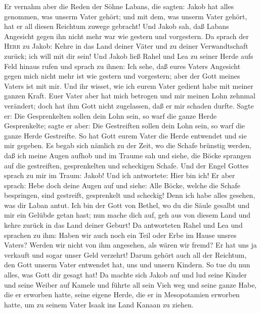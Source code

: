  Er vernahm aber die Reden der Söhne Labans, die sagten:
Jakob hat alles genommen, was unserm Vater gehört; und mit dem, was
unserm Vater gehört, hat er all diesen Reichtum zuwege gebracht!
 Und Jakob sah, daß Labans Angesicht gegen ihn nicht mehr
war wie gestern und vorgestern.  Da sprach der
\textsc{Herr} zu Jakob: Kehre in das Land deiner Väter und zu deiner
Verwandtschaft zurück; ich will mit dir sein!  Und Jakob
ließ Rahel und Lea zu seiner Herde aufs Feld hinaus rufen 
und sprach zu ihnen: Ich sehe, daß eures Vaters Angesicht gegen mich
nicht mehr ist wie gestern und vorgestern; aber der Gott meines Vaters
ist mit mir.  Und ihr wisset, wie ich eurem Vater gedient
habe mit meiner ganzen Kraft.  Euer Vater aber hat mich
betrogen und mir meinen Lohn zehnmal verändert; doch hat ihm Gott nicht
zugelassen, daß er mir schaden durfte.  Sagte er: Die
Gesprenkelten sollen dein Lohn sein, so warf die ganze Herde
Gesprenkelte; sagte er aber: Die Gestreiften sollen dein Lohn sein, so
warf die ganze Herde Gestreifte.  So hat Gott eurem Vater
die Herde entwendet und sie mir gegeben.  Es begab sich
nämlich zu der Zeit, wo die Schafe brünstig werden, daß ich meine Augen
aufhob und im Traume sah und siehe, die Böcke sprangen auf die
gestreiften, gesprenkelten und scheckigen Schafe.  Und
der Engel Gottes sprach zu mir im Traum: Jakob! Und ich antwortete: Hier
bin ich!  Er aber sprach: Hebe doch deine Augen auf und
siehe: Alle Böcke, welche die Schafe bespringen, sind gestreift,
gesprenkelt und scheckig! Denn ich habe alles gesehen, was dir Laban
antut.  Ich bin der Gott von Bethel, wo du die Säule
gesalbt und mir ein Gelübde getan hast; nun mache dich auf, geh aus von
diesem Land und kehre zurück in das Land deiner Geburt! 
Da antworteten Rahel und Lea und sprachen zu ihm: Haben wir auch noch
ein Teil oder Erbe im Hause unsres Vaters?  Werden wir
nicht von ihm angesehen, als wären wir fremd? Er hat uns ja verkauft und
sogar unser Geld verzehrt!  Darum gehört auch all der
Reichtum, den Gott unserm Vater entwendet hat, uns und unsern Kindern.
So tue du nun alles, was Gott dir gesagt hat!  Da machte
sich Jakob auf und lud seine Kinder und seine Weiber auf Kamele
 und führte all sein Vieh weg und seine ganze Habe, die
er erworben hatte, seine eigene Herde, die er in Mesopotamien erworben
hatte, um zu seinem Vater Isaak ins Land Kanaan zu ziehen.
